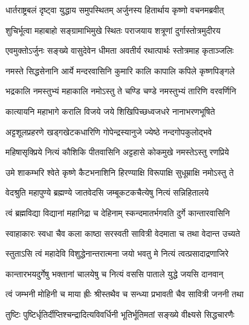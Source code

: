 


\twolineshloka
{धार्तराष्ट्रबलं दृष्ट्वा युद्धाय समुपस्थितम्}
{अर्जुनस्य हितार्थाय कृष्णो वचनमब्रवीत्}


\twolineshloka
{शुचिर्भूत्वा महाबाहो सङ्ग्रामाभिमुखे स्थितः}
{पराजयाय शत्रूणां दुर्गास्तोत्रमुदीरय}


\twolineshloka
{एवमुक्तोऽर्जुनः सङ्ख्ये वासुदेवेन धीमता}
{अवतीर्य रथात्पार्थः स्तोत्रमाह कृताञ्जलिः}


\twolineshloka
{नमस्ते सिद्धसेनानि आर्ये मन्दरवासिनि}
{कुमारि कालि कापालि कपिले कृष्णपिङ्गले}

\twolineshloka
{भद्रकालि नमस्तुभ्यं महाकालि नमोऽस्तु ते}
{चण्डि चण्डे नमस्तुभ्यं तारिणि वरवर्णिनि}

\twolineshloka
{कात्यायनि महाभागे करालि विजये जये}
{शिखिपिच्छध्वजधरे नानाभरणभूषिते}

\twolineshloka
{अट्टशूलप्रहरणे खड्गखेटकधारिणि}
{गोपेन्द्रस्यानुजे ज्येष्ठे नन्दगोपकुलोद्भवे}

\twolineshloka
{महिषासृक्प्रिये नित्यं कौशिकि पीतवासिनि}
{अट्टहासे कोकमुखे नमस्तेऽस्तु रणप्रिये}

\twolineshloka
{उमे शाकम्भरि श्वेते कृष्णे कैटभनाशिनि}
{हिरण्याक्षि विरूपाक्षि सुधूम्राक्षि नमोऽस्तु ते}

\twolineshloka
{वेदश्रुति महापुण्ये ब्रह्मण्ये जातवेदसि}
{जम्बूकटकचैत्येषु नित्यं सन्निहितालये}

\twolineshloka
{त्वं ब्रह्मविद्या विद्यानां महानिद्रा च देहिनाम्}
{स्कन्दमातर्भगवति दुर्गे कान्तारवासिनि}

\twolineshloka
{स्वाहाकारः स्वधा चैव कला काष्ठा सरस्वती}
{सावित्री वेदमाता च तथा वेदान्त उच्यते}

\twolineshloka
{स्तुताऽसि त्वं महादेवि विशुद्धेनान्तरात्मना}
{जयो भवतु मे नित्यं त्वत्प्रसादाद्रणाजिरे}

\twolineshloka
{कान्तारभयदुर्गेषु भक्तानां चालयेषु च}
{नित्यं वससि पाताले युद्धे जयसि दानवान्}

\twolineshloka
{त्वं जम्भनी मोहिनी च माया ह्रीः श्रीस्तथैव च}
{सन्ध्या प्रभावती चैव सावित्री जननी तथा}

\twolineshloka
{तुष्टिः पुष्टिर्धृतिर्दीप्तिश्चन्द्रादित्यविवर्धिनी}
{भूतिर्भूतिमतां सङ्ख्ये वीक्ष्यसे सिद्धचारणैः}

